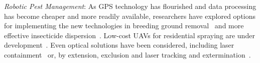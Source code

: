 \noindent  \emph{Robotic Pest Management}:
As GPS technology has flourished and data processing has become cheaper and more readily available, researchers have explored options for implementing the new technologies in breeding ground removal~\cite{anupa2014identification} and more effective insecticide dispersion~\cite{hur2015low}.  Low-cost UAVs for residential spraying are under development~\cite{amenyo2014medizdroids}.  Even optical solutions have been considered, including laser containment~\cite{boonsri2012laser} or, by extension, exclusion and laser tracking and extermination~\cite{kare2010build}.
    
